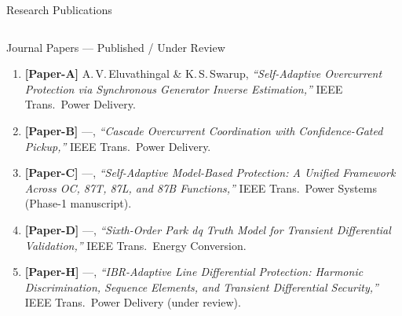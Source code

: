 \documentclass[aspectratio=169, 10pt]{beamer}
\begin{document}
\begin{frame}{Research Publications}
\begin{columns}[t]
\begin{block}{Journal Papers — Published / Under Review}
\footnotesize
\begin{enumerate}\setlength\itemsep{4pt}
  \item \textbf{[Paper-A]} A.\,V.\,Eluvathingal \& K.\,S.\,Swarup,
    \textit{``Self-Adaptive Overcurrent Protection via Synchronous
    Generator Inverse Estimation,''} IEEE Trans.\ Power Delivery.
  \item \textbf{[Paper-B]} ---,
    \textit{``Cascade Overcurrent Coordination with
    Confidence-Gated Pickup,''} IEEE Trans.\ Power Delivery.
  \item \textbf{[Paper-C]} ---,
    \textit{``Self-Adaptive Model-Based Protection: A Unified Framework
    Across OC, 87T, 87L, and 87B Functions,''} IEEE Trans.\ Power
    Systems (Phase-1 manuscript).
  \item \textbf{[Paper-D]} ---,
    \textit{``Sixth-Order Park dq Truth Model for Transient
    Differential Validation,''} IEEE Trans.\ Energy Conversion.
  \item \textbf{[Paper-H]} ---,
    \textit{``IBR-Adaptive Line Differential Protection: Harmonic
    Discrimination, Sequence Elements, and Transient Differential
    Security,''} IEEE Trans.\ Power Delivery (under review).
\end{enumerate}
\end{block}


\end{columns}
\end{frame}
\end{document}
